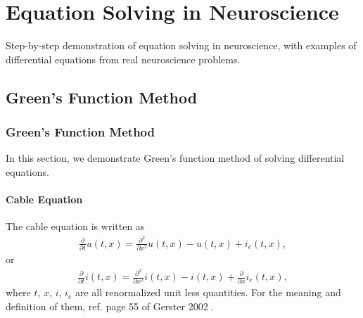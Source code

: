 \documentclass[letterpaper,10pt,english]{sphinxmanual}
\begin{document}
\chapter{Equation Solving in Neuroscience}
\label{\detokenize{equation-solving-in-neuroscience/index::doc}}\label{\detokenize{equation-solving-in-neuroscience/index:equation-solving-in-neuroscience}}
Step-by-step demonstration of equation solving in neuroscience, with examples of differential equations from real neuroscience problems.


\section{Green’s Function Method}
\label{\detokenize{equation-solving-in-neuroscience/green-function::doc}}\label{\detokenize{equation-solving-in-neuroscience/green-function:green-s-function-method}}

\subsection{Green’s Function Method}
\label{\detokenize{equation-solving-in-neuroscience/green-function:id1}}
In this section, we demonstrate Green’s function method of solving differential equations.


\subsubsection{Cable Equation}
\label{\detokenize{equation-solving-in-neuroscience/green-function:cable-equation}}
The cable equation is written as \label{\detokenize{equation-solving-in-neuroscience/green-function:id2}}{\hyperref[\detokenize{equation-solving-in-neuroscience/green-function:gerstner2002}]{\sphinxcrossref{{[}Gerstner2002{]}}}}
\label{\detokenize{equation-solving-in-neuroscience/green-function:equation-eqn-cable-equation-potential}}\begin{equation}\label{equation:equation-solving-in-neuroscience/green-function:eqn-cable-equation-potential}
\begin{split}\frac{\partial}{\partial t} u(t,x) = \frac{\partial^2}{\partial x^2} u(t,x) - u(t,x) + i_{e}(t,x),\end{split}
\end{equation}
or
\label{\detokenize{equation-solving-in-neuroscience/green-function:equation-eqn-cable-equation-current}}\begin{equation}\label{equation:equation-solving-in-neuroscience/green-function:eqn-cable-equation-current}
\begin{split}\frac{\partial}{\partial t} i(t,x) = \frac{\partial^2}{\partial x^2} i(t,x) - i(t,x) + \frac{\partial}{\partial x} i_e (t,x),\end{split}
\end{equation}
where \(t\), \(x\), \(i\), \(i_e\) are all renormalized unit less quantities. For the meaning and definition of them, ref. page 55 of Gerster 2002 \label{\detokenize{equation-solving-in-neuroscience/green-function:id3}}{\hyperref[\detokenize{equation-solving-in-neuroscience/green-function:gerstner2002}]{\sphinxcrossref{{[}Gerstner2002{]}}}}.
\end{document}
